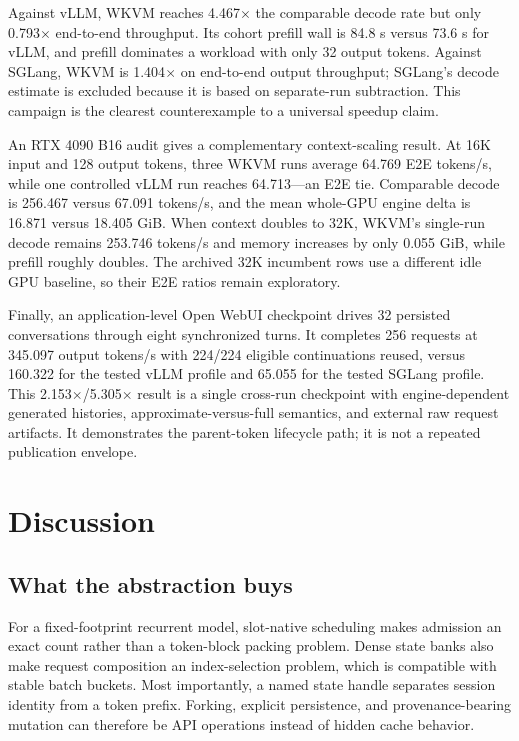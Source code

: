 \documentclass[10pt,letterpaper]{article}
\newcommand{\wkvm}{\textsc{WKVM}}
\begin{document}
Against vLLM, \wkvm{} reaches 4.467$\times$ the comparable decode rate but only
0.793$\times$ end-to-end throughput.  Its cohort prefill wall is 84.8 s versus
73.6 s for vLLM, and prefill dominates a workload with only 32 output tokens.
Against SGLang, \wkvm{} is 1.404$\times$ on end-to-end output throughput; SGLang's
decode estimate is excluded because it is based on separate-run subtraction.
This campaign is the clearest counterexample to a universal speedup claim.

An RTX 4090 B16 audit gives a complementary context-scaling result.  At 16K
input and 128 output tokens, three \wkvm{} runs average 64.769 E2E tokens/s,
while one controlled vLLM run reaches 64.713---an E2E tie.  Comparable decode is
256.467 versus 67.091 tokens/s, and the mean whole-GPU engine delta is 16.871
versus 18.405 GiB.  When context doubles to 32K, \wkvm's single-run decode
remains 253.746 tokens/s and memory increases by only 0.055 GiB, while prefill
roughly doubles.  The archived 32K incumbent rows use a different idle GPU
baseline, so their E2E ratios remain exploratory.

Finally, an application-level Open WebUI checkpoint drives 32 persisted
conversations through eight synchronized turns.  It completes 256 requests at
345.097 output tokens/s with 224/224 eligible continuations reused, versus
160.322 for the tested vLLM profile and 65.055 for the tested SGLang profile.
This 2.153$\times$/5.305$\times$ result is a single cross-run checkpoint with
engine-dependent generated histories, approximate-versus-full semantics, and
external raw request artifacts.  It demonstrates the parent-token lifecycle
path; it is not a repeated publication envelope.

\section{Discussion}

\subsection{What the abstraction buys}

For a fixed-footprint recurrent model, slot-native scheduling makes admission
an exact count rather than a token-block packing problem.  Dense state banks
also make request composition an index-selection problem, which is compatible
with stable batch buckets.  Most importantly, a named state handle separates
session identity from a token prefix.  Forking, explicit persistence, and
provenance-bearing mutation can therefore be API operations instead of hidden
cache behavior.
\end{document}
